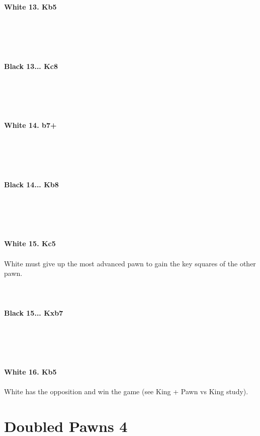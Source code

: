 \documentclass{article}
\begin{document}
\\
\\
\textbf{White 13. Kb5}\\
\\
\\
\\

\\
\\
\textbf{Black 13... Kc8}\\
\\
\\
\\

\\
\\
\textbf{White 14. b7+}\\
\\
\\
\\

\\
\\
\textbf{Black 14... Kb8}\\
\\
\\
\\

\\
\\
\textbf{White 15. Kc5}\\
\\
White must give up the most advanced pawn to gain the key squares of the other pawn.\\
\\

\\
\\
\textbf{Black 15... Kxb7}\\
\\
\\
\\

\\
\\
\textbf{White 16. Kb5}\\
\\
White has the opposition and win the game (see King + Pawn vs King study).\section{ Doubled Pawns 4}
\end{document}
